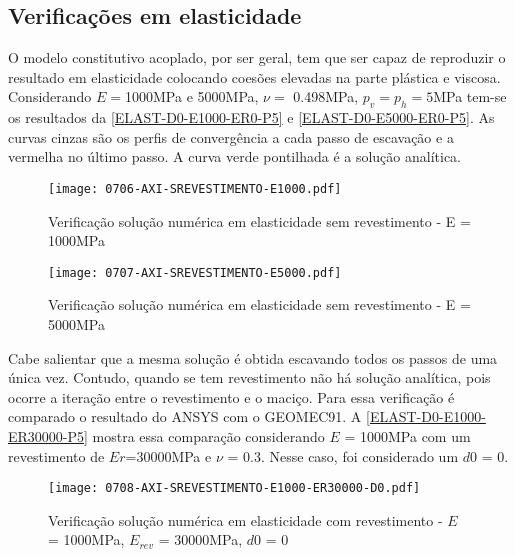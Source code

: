 \subsection{Verificações em elasticidade}

O modelo constitutivo acoplado, por ser geral, tem que ser capaz de reproduzir o resultado em elasticidade colocando coesões elevadas na parte plástica e viscosa. Considerando $E =$1000MPa e 5000MPa, $\nu =$ 0.498MPa, $p_v = p_h = 5$MPa tem-se os resultados da \autoref{ELAST-D0-E1000-ER0-P5} e \autoref{ELAST-D0-E5000-ER0-P5}. As curvas cinzas são os perfis de convergência a cada passo de escavação e a vermelha no último passo. A curva verde pontilhada é a solução analítica.

\begin{figure}[H]
	\begin{center}
		\texttt{[image: 0706-AXI-SREVESTIMENTO-E1000.pdf]}
	\end{center}
	\caption{\label{ELAST-D0-E1000-ER0-P5}Verificação solução numérica em elasticidade sem revestimento - E = 1000MPa}
\end{figure}

\begin{figure}[H]
	\begin{center}
		\texttt{[image: 0707-AXI-SREVESTIMENTO-E5000.pdf]}
	\end{center}
	\caption{\label{ELAST-D0-E5000-ER0-P5}Verificação solução numérica em elasticidade sem revestimento - E = 5000MPa}
\end{figure}

Cabe salientar que a mesma solução é obtida escavando todos os passos de uma única vez. Contudo, quando se tem revestimento não há solução analítica, pois ocorre a iteração entre o revestimento e o maciço. Para essa verificação é comparado o resultado do ANSYS com o GEOMEC91. A \autoref{ELAST-D0-E1000-ER30000-P5} mostra essa comparação considerando $E$ = 1000MPa com um revestimento de $Er$=30000MPa e $\nu$ = 0.3. Nesse caso, foi considerado um $d0$ = 0.

\begin{figure}[H]
	\begin{center}
		\texttt{[image: 0708-AXI-SREVESTIMENTO-E1000-ER30000-D0.pdf]}
	\end{center}
	\caption{\label{ELAST-D0-E1000-ER30000-P5}Verificação solução numérica em elasticidade com revestimento - $E$ = 1000MPa, $E_{rev}$ = 30000MPa, $d0$ = 0}
\end{figure}

